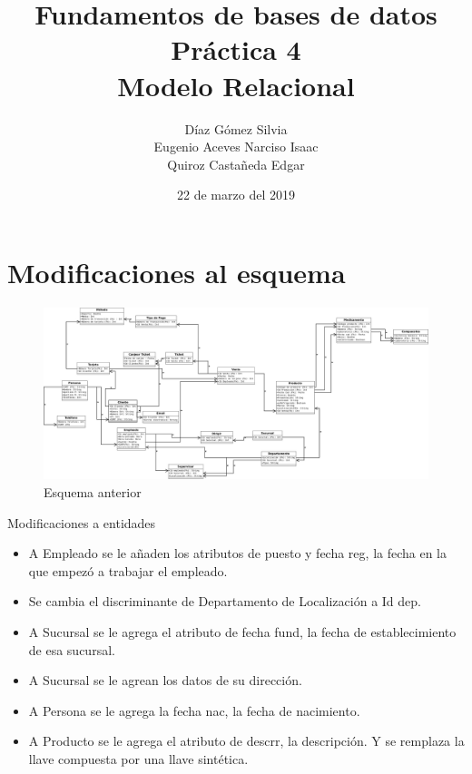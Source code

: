 \documentclass{article}
\begin{document}
    \title{
        Fundamentos de bases de datos \\
        Práctica 4 \\
        Modelo Relacional
    }
    \author{
        Díaz Gómez Silvia \\
        Eugenio Aceves Narciso Isaac \\
        Quiroz Castañeda Edgar
    }
    \date {
        22 de marzo del 2019    
    }
    \maketitle
    \section{Modificaciones al esquema}
    \begin{figure}[H]
        \includegraphics[scale=0.22]{img/practica04.jpeg}
        \caption{Esquema anterior}
    \end{figure}
    Modificaciones a entidades
    \begin{itemize}
        \item A Empleado se le añaden los atributos de puesto y fecha reg, la
        fecha en la que empezó a trabajar el empleado.
        \item Se cambia el discriminante de Departamento de Localización a Id dep.
        \item A Sucursal se le agrega el atributo de fecha fund, la fecha de 
        establecimiento de esa sucursal.
        \item A Sucursal se le agrean los datos de su dirección.
        \item A Persona se le agrega la fecha nac, la fecha de nacimiento.
        \item A Producto se le agrega el atributo de descrr, la descripción. Y 
        se remplaza la llave compuesta por una llave sintética.
    \end{itemize}
\end{document}
